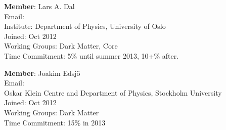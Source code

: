 \textbf{Member}: Lars A. Dal\\
Email: \\
Institute: Department of Physics, University of Oslo\\
Joined: Oct 2012\\
Working Groups: Dark Matter, Core\\
Time Commitment: 5\% until summer 2013, 10+\% after.

\textbf{Member}: Joakim Edsj\"o\\
Email: \\
Oskar Klein Centre and Department of Physics, Stockholm University\\
Joined: Oct 2012\\
Working Groups: Dark Matter\\
Time Commitment: 15\% in 2013


